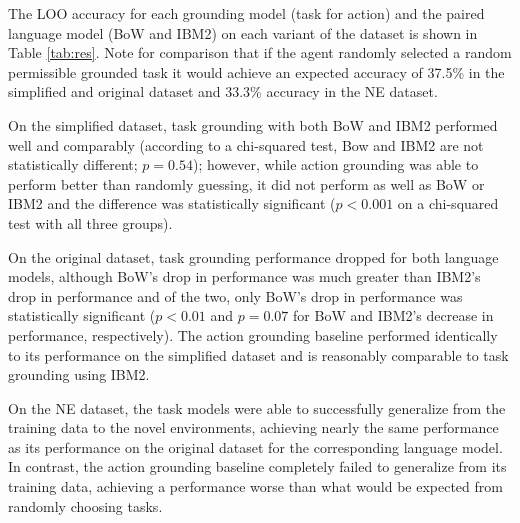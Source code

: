 \documentclass[conference]{IEEEtran}
\begin{document}
The LOO accuracy for each grounding model (task for action) and the paired language model (BoW and IBM2) on each variant of the dataset is shown in Table \ref{tab:res}. Note for comparison that if the agent randomly selected a random permissible grounded task it would achieve an expected accuracy of 37.5\% in the simplified and original dataset and 33.3\% accuracy in the NE dataset. 


On the simplified dataset, task grounding with both BoW and IBM2 performed well and comparably (according to a chi-squared test, Bow and IBM2 are not statistically different; $p = 0.54$); however, while action grounding was able to perform better than randomly guessing, it did not perform as well as BoW or IBM2 and the difference was statistically significant ($p < 0.001$ on a chi-squared test with all three groups).

On the original dataset, task grounding performance dropped for both language models, although BoW's drop in performance was much greater than IBM2's drop in performance and of the two, only BoW's drop in performance was statistically significant ($p < 0.01$ and $p = 0.07$ for BoW and IBM2's decrease in performance, respectively). The action grounding baseline performed identically to its performance on the simplified dataset and is reasonably comparable to task grounding using IBM2.

On the NE dataset, the task models were able to successfully generalize from the training data to the novel environments, achieving nearly the same performance as its performance on the original dataset for the corresponding language model. In contrast, the action grounding baseline completely failed to generalize from its training data, achieving a performance worse than what would be expected from randomly choosing tasks.

\end{document}
